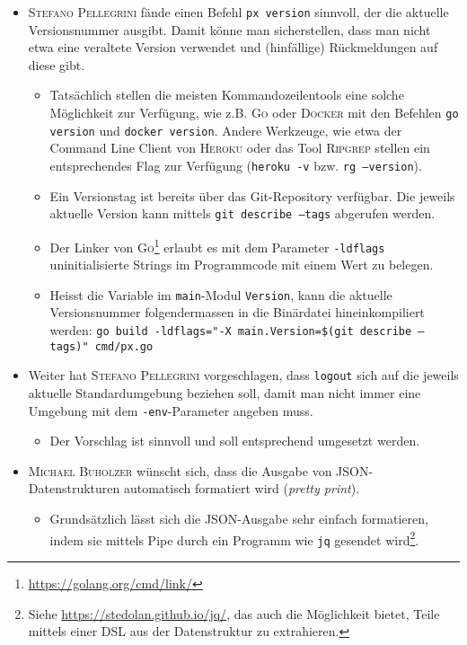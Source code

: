 \begin{itemize}
    \item \textsc{Stefano Pellegrini} fände einen Befehl \texttt{px version} sinnvoll, der die aktuelle Versionsnummer ausgibt. Damit könne man sicherstellen, dass man nicht etwa eine veraltete Version verwendet und (hinfällige) Rückmeldungen auf diese gibt.
        \begin{itemize}
            \item Tatsächlich stellen die meisten Kommandozeilentools eine solche Möglichkeit zur Verfügung, wie z.B. \textsc{Go} oder \textsc{Docker} mit den Befehlen \texttt{go version} und \texttt{docker version}. Andere Werkzeuge, wie etwa der Command Line Client von \textsc{Heroku} oder das Tool \textsc{Ripgrep} stellen ein entsprechendes Flag zur Verfügung (\texttt{heroku -v} bzw. \texttt{rg --version}).
            \item Ein Versionstag ist bereits über das Git-Repository verfügbar. Die jeweils aktuelle Version kann mittels \texttt{git describe --tags} abgerufen werden.
            \item Der Linker von \textsc{Go}\footnote{\url{https://golang.org/cmd/link/}} erlaubt es mit dem Parameter \texttt{-ldflags} uninitialisierte Strings im Programmcode mit einem Wert zu belegen.
            \item Heisst die Variable im \texttt{main}-Modul \texttt{Version}, kann die aktuelle Versionsnummer folgendermassen in die Binärdatei hineinkompiliert werden: \texttt{go build -ldflags="{}-X main.Version=\$(git describe --tags)"{} cmd/px.go}
        \end{itemize} 
    \item Weiter hat \textsc{Stefano Pellegrini} vorgeschlagen, dass \texttt{logout} sich auf die jeweils aktuelle Standardumgebung beziehen soll, damit man nicht immer eine Umgebung mit dem \texttt{-env}-Parameter angeben muss.
    \begin{itemize}
        \item Der Vorschlag ist sinnvoll und soll entsprechend umgesetzt werden.
    \end{itemize}
\item \textsc{Michael Buholzer} wünscht sich, dass die Ausgabe von JSON-Datenstrukturen automatisch formatiert wird (\textit{pretty print}).
    \begin{itemize}
        \item Grundsätzlich lässt sich die JSON-Ausgabe sehr einfach formatieren, indem sie mittels Pipe durch ein Programm wie \texttt{jq} gesendet wird\footnote{Siehe \url{https://stedolan.github.io/jq/}, das auch die Möglichkeit bietet, Teile mittels einer DSL aus der Datenstruktur zu extrahieren.}.

\end{itemize}
\end{itemize}
